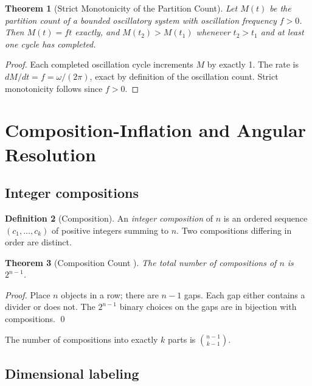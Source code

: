 \documentclass[twocolumn,10pt,a4paper]{article}
\theoremstyle{thmstyle}
\newtheorem{theorem}{Theorem}[section]
\theoremstyle{definition}
\newtheorem{definition}[theorem]{Definition}
\theoremstyle{remark}
\begin{document}
\begin{theorem}[Strict Monotonicity of the Partition Count]
\label{thm:monotone}
Let $M(t)$ be the partition count of a bounded oscillatory system with
oscillation frequency $f > 0$. Then $M(t) = ft$ exactly, and
$M(t_2) > M(t_1)$ whenever $t_2 > t_1$ and at least one cycle has completed.
\end{theorem}

\begin{proof}
Each completed oscillation cycle increments $M$ by exactly 1. The rate is
$dM/dt = f = \omega/(2\pi)$, exact by definition of the oscillation count.
Strict monotonicity follows since $f > 0$.
\end{proof}

\section{Composition-Inflation and Angular Resolution}
\label{sec:inflation}

\subsection{Integer compositions}

\begin{definition}[Composition]
An \emph{integer composition} of $n$ is an ordered sequence $(c_1,\ldots,c_k)$
of positive integers summing to $n$. Two compositions differing in order
are distinct.
\end{definition}

\begin{theorem}[Composition Count \citealp{andrews1976}]
\label{thm:compcount}
The total number of compositions of $n$ is $2^{n-1}$.
\end{theorem}

\begin{proof}
Place $n$ objects in a row; there are $n-1$ gaps. Each gap either contains
a divider or does not. The $2^{n-1}$ binary choices on the gaps are in
bijection with compositions. \qed
\end{proof}

The number of compositions into exactly $k$ parts is $\binom{n-1}{k-1}$.

\subsection{Dimensional labeling}
\end{document}
